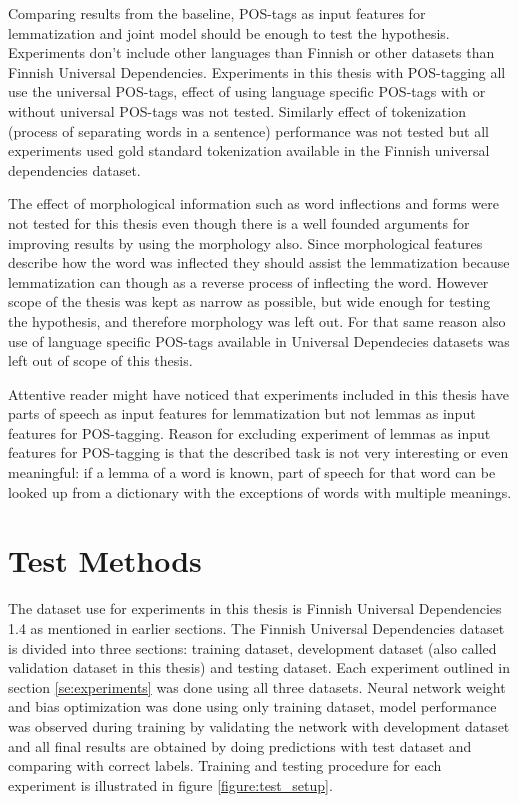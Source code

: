 \documentclass[12pt,a4paper,english
]{tutthesis}
\begin{document}
Comparing results from the baseline, POS-tags as input features for lemmatization and joint model should be enough to test the hypothesis. Experiments don't include other languages than Finnish or other datasets than Finnish Universal Dependencies. Experiments in this thesis with POS-tagging all use the universal POS-tags, effect of using language specific POS-tags with or without universal POS-tags was not tested. Similarly effect of tokenization (process of separating words in a sentence) performance was not tested but all experiments used gold standard tokenization available in the Finnish universal dependencies dataset.

The effect of morphological information such as word inflections and forms were not tested for this thesis even though there is a well founded arguments for improving results by using the morphology also. Since morphological features describe how the word was inflected they should assist the lemmatization because lemmatization can though as a reverse process of inflecting the word. However scope of the thesis was kept as narrow as possible, but wide enough for testing the hypothesis, and therefore morphology was left out. For that same reason also use of language specific POS-tags available in Universal Dependecies datasets was left out of scope of this thesis. 

Attentive reader might have noticed that experiments included in this thesis have parts of speech as input features for lemmatization but not lemmas as input features for POS-tagging. Reason for excluding experiment of lemmas as input features for POS-tagging is that the described task is not very interesting or even meaningful: if a lemma of a word is known, part of speech for that word can be looked up from a dictionary with the exceptions of words with multiple meanings.


\section{Test Methods}
\label{se:test_methods}
The dataset use for experiments in this thesis is Finnish Universal Dependencies 1.4 as mentioned in earlier sections. The Finnish Universal Dependencies dataset is divided into three sections: training dataset, development dataset (also called validation dataset in this thesis) and testing dataset. Each experiment outlined in section \ref{se:experiments} was done using all three datasets. Neural network weight and bias optimization was done using only training dataset, model performance was observed during training by validating the network with development dataset and all final results are obtained by doing predictions with test dataset and comparing with correct labels. Training and testing procedure for each experiment is illustrated in figure \ref{figure:test_setup}.
\end{document}
